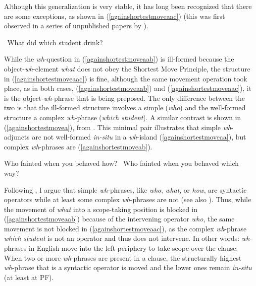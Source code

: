 \noindent Although this generalization is very stable, it has long been recognized that there are some exceptions, as shown in (\ref{againshortestmoveaac}) (this was first observed in a series of unpublished papers by \citealt{reinhart1986mimeo, reinhart1987mimeo, reinhart1990mimeo}).

\begin{exe}
\ex \textcolor{white}{*}What did which student drink? \label{againshortestmoveaac}
\end{exe}

\noindent While the \textit{wh}-question in (\ref{againshortestmoveaab}) is ill-formed because the object-\textit{wh}-element \textit{what} does not obey the Shortest Move Principle, the structure in (\ref{againshortestmoveaac}) is fine, although the same movement operation took place, as in both cases, (\ref{againshortestmoveaab}) and (\ref{againshortestmoveaac}), it is the object-\textit{wh}-phrase that is being preposed. The only difference between the two is that the ill-formed structure involves a simple (\textit{who}) and the well-formed structure a complex \textit{wh}-phrase (\textit{which student}). A similar contrast is shown in (\ref{againshortestmovea}), from \citet[4--5]{reinhart1990mimeo}. This minimal pair illustrates that simple \textit{wh}-adjuncts are not well-formed \textit{in-situ} in a \textit{wh}-island (\ref{againshortestmoveaa}), but complex \textit{wh}-phrases are (\ref{againshortestmoveab}).

\begin{exe}
\ex\label{againshortestmovea}\begin{xlist}
\ex *Who fainted when you behaved how? \label{againshortestmoveaa}
\ex \textcolor{white}{*}Who fainted when you behaved which way? \label{againshortestmoveab}
\end{xlist}
\end{exe}

\noindent Following \citet{van2010complex}, I argue that simple \textit{wh}-phrases, like \textit{who}, \textit{what}, or \textit{how}, are syntactic operators while at least some complex \textit{wh}-phrases are not (see also \citealt{cinque1986bare, pesetsky1987wh, dobrovie1990clitic, grewendorf2012wh}). Thus, while the movement of \textit{what} into a scope-taking position is blocked in (\ref{againshortestmoveaab}) because of the intervening operator \textit{who}, the same movement is not blocked in (\ref{againshortestmoveaac}), as the complex \textit{wh}-phrase \textit{which student} is not an operator and thus does not intervene. In other words: \textit{wh}-phrases in English move into the left periphery to take scope over the clause. When two or more \textit{wh}-phrases are present in a clause, the structurally highest \textit{wh}-phrase that is a syntactic operator is moved and the lower ones remain \textit{in-situ} (at least at PF).

